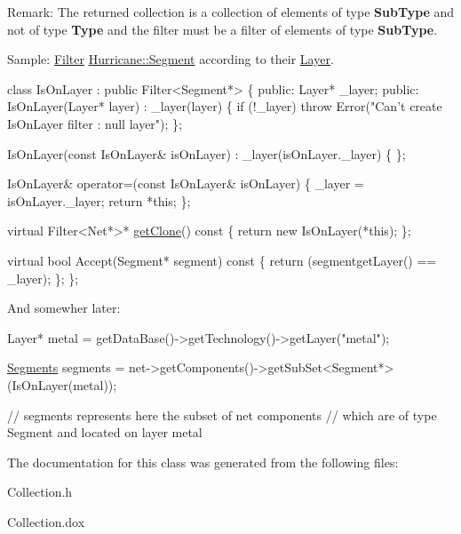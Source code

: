 \begin{DoxyParagraph}{Remark\+:}
The returned collection is a collection of elements of type {\bfseries Sub\+Type} and not of type {\bfseries Type} and the filter must be a filter of elements of type {\bfseries Sub\+Type}.
\end{DoxyParagraph}
\begin{DoxyParagraph}{Sample\+:}
\hyperlink{classHurricane_1_1Filter}{Filter} \hyperlink{classHurricane_1_1Segment}{Hurricane\+::\+Segment} according to their \hyperlink{classHurricane_1_1Layer}{Layer}. 
\begin{DoxyCode}
\textcolor{keyword}{class }IsOnLayer : \textcolor{keyword}{public} Filter<Segment*> \{
   \textcolor{keyword}{public}:
      Layer* \_layer;
   \textcolor{keyword}{public}:
      IsOnLayer(Layer* layer)
        : \_layer(layer)
      \{
         \textcolor{keywordflow}{if} (!\_layer) \textcolor{keywordflow}{throw} Error(\textcolor{stringliteral}{"Can't create IsOnLayer filter : null layer"});
      \};
 
      IsOnLayer(\textcolor{keyword}{const} IsOnLayer& isOnLayer)
        : \_layer(isOnLayer.\_layer)
      \{ \};
 
      IsOnLayer& operator=(\textcolor{keyword}{const} IsOnLayer& isOnLayer)
      \{
         \_layer = isOnLayer.\_layer;
         \textcolor{keywordflow}{return} *\textcolor{keyword}{this};
      \};
 
      \textcolor{keyword}{virtual} Filter<Net*>* \hyperlink{classHurricane_1_1Collection_ac75b91d3952b36e14f21174958523924}{getClone}()\textcolor{keyword}{ const}
\textcolor{keyword}{      }\{
         \textcolor{keywordflow}{return} \textcolor{keyword}{new} IsOnLayer(*\textcolor{keyword}{this});
      \};
 
      \textcolor{keyword}{virtual} \textcolor{keywordtype}{bool} Accept(Segment* segment)\textcolor{keyword}{ const}
\textcolor{keyword}{      }\{
         \textcolor{keywordflow}{return} (segmentgetLayer() == \_layer);
      \};
\};
\end{DoxyCode}

\end{DoxyParagraph}
And somewher later\+: 
\begin{DoxyCode}
Layer* metal = getDataBase()->getTechnology()->getLayer(\textcolor{stringliteral}{"metal"});
 
\hyperlink{namespaceHurricane_a30748fa53a81cb597d4a13d651238716}{Segments} segments = net->getComponents()->getSubSet<Segment*>(IsOnLayer(metal));
 
\textcolor{comment}{// segments represents here the subset of net components}
\textcolor{comment}{// which are of type Segment and located on layer metal}
\end{DoxyCode}
 

The documentation for this class was generated from the following files\+:\begin{DoxyCompactItemize}
\item 
Collection.\+h\item 
Collection.\+dox\end{DoxyCompactItemize}
